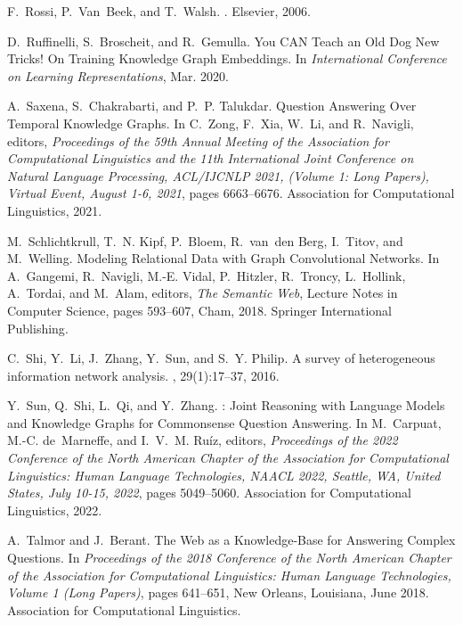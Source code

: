 \documentclass[11pt]{article}
\begin{document}
\begin{thebibliography}{10}
\begin{small}
F.~Rossi, P.~Van~Beek, and T.~Walsh.
.
\newblock Elsevier, 2006.

D.~Ruffinelli, S.~Broscheit, and R.~Gemulla.
\newblock You {{CAN Teach}} an {{Old Dog New Tricks}}! {{On Training Knowledge
  Graph Embeddings}}.
\newblock In {\em International {{Conference}} on {{Learning
  Representations}}}, Mar. 2020.

A.~Saxena, S.~Chakrabarti, and P.~P. Talukdar.
\newblock Question {{Answering Over Temporal Knowledge Graphs}}.
\newblock In C.~Zong, F.~Xia, W.~Li, and R.~Navigli, editors, {\em Proceedings
  of the 59th {{Annual Meeting}} of the {{Association}} for {{Computational
  Linguistics}} and the 11th {{International Joint Conference}} on {{Natural
  Language Processing}}, {{ACL}}/{{IJCNLP}} 2021, ({{Volume}} 1: {{Long
  Papers}}), {{Virtual Event}}, {{August}} 1-6, 2021}, pages 6663--6676.
  {Association for Computational Linguistics}, 2021.

M.~Schlichtkrull, T.~N. Kipf, P.~Bloem, R.~{van~den Berg}, I.~Titov, and
  M.~Welling.
\newblock Modeling {{Relational Data}} with {{Graph Convolutional Networks}}.
\newblock In A.~Gangemi, R.~Navigli, M.-E. Vidal, P.~Hitzler, R.~Troncy,
  L.~Hollink, A.~Tordai, and M.~Alam, editors, {\em The {{Semantic Web}}},
  Lecture {{Notes}} in {{Computer Science}}, pages 593--607, {Cham}, 2018.
  {Springer International Publishing}.

C.~Shi, Y.~Li, J.~Zhang, Y.~Sun, and S.~Y. Philip.
\newblock A survey of heterogeneous information network analysis.
,
  29(1):17--37, 2016.

Y.~Sun, Q.~Shi, L.~Qi, and Y.~Zhang.
: {{Joint Reasoning}} with {{Language Models}} and
  {{Knowledge Graphs}} for {{Commonsense Question Answering}}.
\newblock In M.~Carpuat, M.-C. de~Marneffe, and I.~V.~M. Ru{\'i}z, editors,
  {\em Proceedings of the 2022 {{Conference}} of the {{North American Chapter}}
  of the {{Association}} for {{Computational Linguistics}}: {{Human Language
  Technologies}}, {{NAACL}} 2022, {{Seattle}}, {{WA}}, {{United States}},
  {{July}} 10-15, 2022}, pages 5049--5060. {Association for Computational
  Linguistics}, 2022.

A.~Talmor and J.~Berant.
\newblock The {{Web}} as a {{Knowledge-Base}} for {{Answering Complex
  Questions}}.
\newblock In {\em Proceedings of the 2018 {{Conference}} of the {{North
  American Chapter}} of the {{Association}} for {{Computational Linguistics}}:
  {{Human Language Technologies}}, {{Volume}} 1 ({{Long Papers}})}, pages
  641--651, {New Orleans, Louisiana}, June 2018. {Association for Computational
  Linguistics}.


\end{small}
\end{thebibliography}
\end{document}
